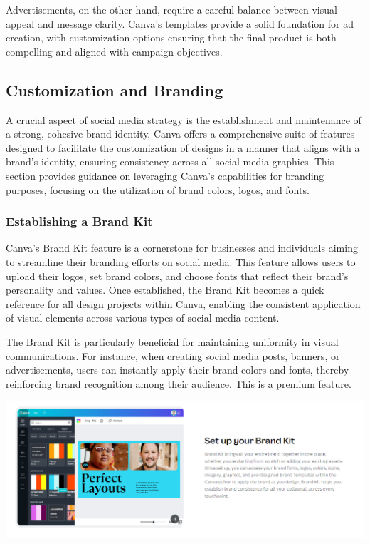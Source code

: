 \documentclass[
]{book}
\begin{document}
Advertisements, on the other hand, require a careful balance between visual appeal and message clarity. Canva's templates provide a solid foundation for ad creation, with customization options ensuring that the final product is both compelling and aligned with campaign objectives.

\hypertarget{customization-and-branding}{%
\subsection*{Customization and Branding}\label{customization-and-branding}}

A crucial aspect of social media strategy is the establishment and maintenance of a strong, cohesive brand identity. Canva offers a comprehensive suite of features designed to facilitate the customization of designs in a manner that aligns with a brand's identity, ensuring consistency across all social media graphics. This section provides guidance on leveraging Canva's capabilities for branding purposes, focusing on the utilization of brand colors, logos, and fonts.

\hypertarget{establishing-a-brand-kit}{%
\subsubsection*{Establishing a Brand Kit}\label{establishing-a-brand-kit}}

Canva's Brand Kit feature is a cornerstone for businesses and individuals aiming to streamline their branding efforts on social media. This feature allows users to upload their logos, set brand colors, and choose fonts that reflect their brand's personality and values. Once established, the Brand Kit becomes a quick reference for all design projects within Canva, enabling the consistent application of visual elements across various types of social media content.

The Brand Kit is particularly beneficial for maintaining uniformity in visual communications. For instance, when creating social media posts, banners, or advertisements, users can instantly apply their brand colors and fonts, thereby reinforcing brand recognition among their audience. This is a premium feature.

\href{https://www.canva.com/pro/brand-kit/}{\includegraphics[width=1\textwidth,height=\textheight]{images/clipboard-658121144.png}}
\end{document}
